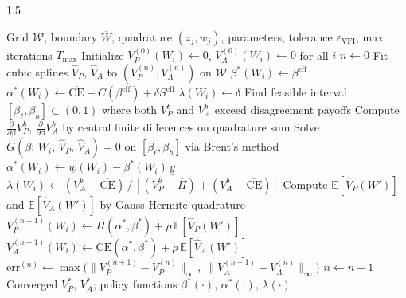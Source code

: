 \documentclass[12pt]{article}
\theoremstyle{definition}
\theoremstyle{plain}
\begin{document}
\begin{spacing}{1.5}
\begin{algorithm}[htbp]
\caption{Value function iteration}
\label{alg:vfi}
\begin{algorithmic}[1]
\Require Grid $\mathcal{W}$, boundary $\overline{W}$,
         quadrature $(z_{j}, w_{j})$, parameters,
         tolerance $\varepsilon_{\mathrm{VFI}}$,
         max iterations $T_{\max}$
\State Initialize $V_{P}^{(0)}(W_{i}) \leftarrow 0$,\;
       $V_{A}^{(0)}(W_{i}) \leftarrow 0$ for all $i$
\State $n \leftarrow 0$
\Repeat
    \State Fit cubic splines $\hat{V}_{P}$, $\hat{V}_{A}$
           to $(V_{P}^{(n)}, V_{A}^{(n)})$ on $\mathcal{W}$
            \State $\beta^{*}(W_{i}) \leftarrow \beta^{\mathrm{eff}}$
            \State $\alpha^{*}(W_{i}) \leftarrow
                   \overline{\text{CE}} - C(\beta^{\mathrm{eff}})
                   + \delta S^{\mathrm{eff}}$
            \State $\lambda(W_{i}) \leftarrow \delta$
        \Else
            \State Find feasible interval
                   $[\beta_{\ell}, \beta_{h}] \subset (0,1)$
                   where both $V_{P}^{b}$ and $V_{A}^{b}$ exceed
                   disagreement payoffs
            \State Compute $\tfrac{\partial}{\partial\beta} V_P^b$, $\tfrac{\partial}{\partial\beta} V_A^b$
                   by central finite differences on quadrature sum
            \State Solve $G(\beta;\,W_{i},\,\hat{V}_{P},\,\hat{V}_{A}) = 0$
                   on $[\beta_{\ell}, \beta_{h}]$ via Brent's method
            \State $\alpha^{*}(W_{i})
                   \leftarrow \underline{w}(W_{i})
                   - \beta^{*}(W_{i})\,\underline{y}$
            \State $\lambda(W_{i})
                   \leftarrow (V_{A}^{b} - \overline{\text{CE}})\,/\,
                   [(V_{P}^{b} - \overline{\Pi})
                   + (V_{A}^{b} - \overline{\text{CE}})]$
        \EndIf
        \State Compute $\mathbb{E}[\hat{V}_{P}(W')]$ and
               $\mathbb{E}[\hat{V}_{A}(W')]$ by Gauss-Hermite quadrature
        \State $V_{P}^{(n+1)}(W_{i})
               \leftarrow \Pi(\alpha^{*}, \beta^{*})
               + \rho\,\mathbb{E}[\hat{V}_{P}(W')]$
        \State $V_{A}^{(n+1)}(W_{i})
               \leftarrow \mathrm{CE}(\alpha^{*}, \beta^{*})
               + \rho\,\mathbb{E}[\hat{V}_{A}(W')]$
    \EndFor
    \State $\mathrm{err}^{(n)}
           \leftarrow \max\!\bigl(
           \|V_{P}^{(n+1)} - V_{P}^{(n)}\|_{\infty},\;
           \|V_{A}^{(n+1)} - V_{A}^{(n)}\|_{\infty}\bigr)$
    \State $n \leftarrow n + 1$
\Ensure Converged $V_{P}^{*}$, $V_{A}^{*}$;
        policy functions $\beta^{*}(\cdot)$,
        $\alpha^{*}(\cdot)$, $\lambda(\cdot)$
\end{algorithmic}
\end{algorithm}
 

\end{spacing}
\end{document}
